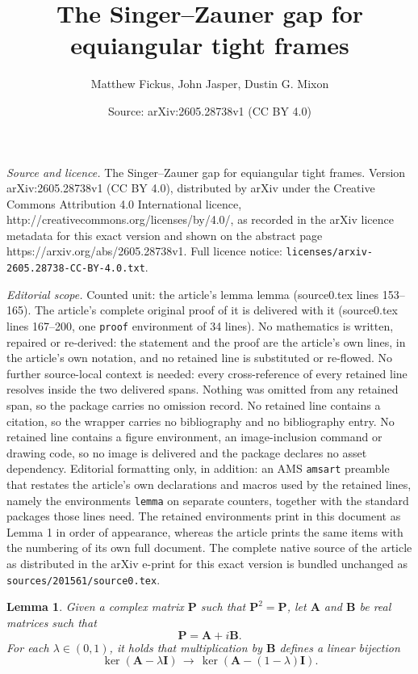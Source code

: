 \documentclass[10pt,a4paper]{amsart}
\title{The Singer--Zauner gap for equiangular tight frames}
\author{Matthew Fickus, John Jasper, Dustin G. Mixon}
\date{Source: arXiv:2605.28738v1 (CC BY 4.0)}
\newtheorem{lemma}{Lemma}
\begin{document}
\maketitle

\noindent\emph{Source and licence.} The Singer--Zauner gap for equiangular tight frames. Version arXiv:2605.28738v1 (CC BY 4.0), distributed by arXiv under the Creative Commons Attribution 4.0 International licence, http://creativecommons.org/licenses/by/4.0/, as recorded in the arXiv licence metadata for this exact version and shown on the abstract page https://arxiv.org/abs/2605.28738v1. Full licence notice: \texttt{licenses/arxiv-2605.28738-CC-BY-4.0.txt}.\par\smallskip

\noindent\textit{Editorial scope.} Counted unit: the article's lemma lemma (source0.tex lines 153--165). The article's complete original proof of it is delivered with it (source0.tex lines 167--200, one \texttt{proof} environment of 34 lines). No mathematics is written, repaired or re-derived: the statement and the proof are the article's own lines, in the article's own notation, and no retained line is substituted or re-flowed.  No further source-local context is needed: every cross-reference of every retained line resolves inside the two delivered spans.  Nothing was omitted from any retained span, so the package carries no omission record.  No retained line contains a citation, so the wrapper carries no bibliography and no bibliography entry.  No retained line contains a figure environment, an image-inclusion command or drawing code, so no image is delivered and the package declares no asset dependency.  Editorial formatting only, in addition: an AMS \texttt{amsart} preamble that restates the article's own declarations and macros used by the retained lines, namely the environments \texttt{lemma} on separate counters, together with the standard packages those lines need.  The retained environments print in this document as Lemma 1 in order of appearance, whereas the article prints the same items with the numbering of its own full document.  The complete native source of the article as distributed in the arXiv e-print for this exact version is bundled unchanged as \texttt{sources/201561/source0.tex}.
\begin{lemma}
Given a complex matrix $\boldsymbol{P}$ such that $\boldsymbol{P}^2=\boldsymbol{P}$, let $\boldsymbol{A}$ and $\boldsymbol{B}$ be real matrices such that
\[
\boldsymbol{P}
=\boldsymbol{A}+i\boldsymbol{B}.
\]
For each $\lambda\in(0,1)$, it holds that multiplication by $\boldsymbol{B}$ defines a linear bijection
\[
\operatorname{ker}(\boldsymbol{A}-\lambda\boldsymbol{I})
\,\longrightarrow\,
\operatorname{ker}(\boldsymbol{A}-(1-\lambda)\boldsymbol{I}).
\]
\end{lemma}
\end{document}
